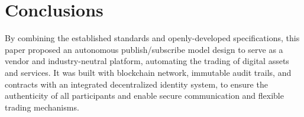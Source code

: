 \documentclass[conference]{IEEEtran}
\begin{document}
\section{Conclusions}
By combining the established standards and openly-developed specifications, this paper proposed an autonomous publish/subscribe model design to serve as a vendor and industry-neutral platform, automating the trading of digital assets and services. It was built with blockchain network, immutable audit trails, and contracts with an integrated decentralized identity system, to ensure the authenticity of all participants and enable secure communication and flexible trading mechanisms.



\end{document}
